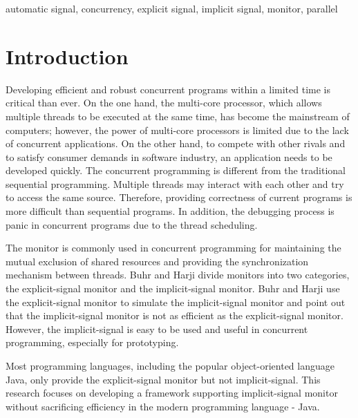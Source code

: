 \documentclass[10pt, conference, compsocconf]{IEEEtran}
\begin{document}
\begin{IEEEkeywords}
automatic signal, concurrency, explicit signal, implicit signal,
monitor, parallel

\end{IEEEkeywords}


%
\IEEEpeerreviewmaketitle



\section{Introduction} \label{sec:intro}
Developing efficient and robust concurrent programs within a limited time is 
critical than ever. On the one hand, the multi-core processor, which allows 
multiple threads to be executed at the same time, has become the mainstream of 
computers; however, the power of multi-core processors is limited due to the 
lack of concurrent applications. On the other hand, to compete with other rivals
and to satisfy consumer demands in software industry, an application needs to be
developed quickly. The concurrent programming is 
different from the traditional sequential programming. Multiple threads may 
interact with each other and try to access the same source. Therefore, providing
correctness of current programs is more difficult than sequential programs. In 
addition, the debugging process is panic in concurrent programs due to the 
thread scheduling. 

The monitor \cite{hoa74} is commonly used in concurrent programming for 
maintaining the mutual exclusion of shared resources and providing the 
synchronization mechanism between threads. Buhr and Harji \cite{bh05} divide 
monitors into two categories, the explicit-signal monitor and the 
implicit-signal monitor. Buhr and Harji use the explicit-signal monitor to 
simulate the implicit-signal monitor and point out that the implicit-signal 
monitor is not as efficient as the explicit-signal monitor. However, the 
implicit-signal is easy to be used and useful in concurrent programming,
especially for prototyping. 


Most programming languages, including the popular object-oriented language Java,
only provide the explicit-signal monitor but not implicit-signal. This research 
focuses on developing a framework supporting implicit-signal monitor without
sacrificing efficiency in the modern programming language - Java. 
\end{document}
